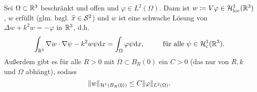 \begin{satz}\label{satz: w ist schwache lösung von helmholtz mit rhs -S}
	Sei \(\Omega\subset\mathbb{R}^3\) beschränkt und offen und \(\varphi\in L^2(\Omega)\). Dann ist \(w\coloneqq V\varphi\in\mathcal{H}_{\mathrm{loc}}^1(\mathbb{R}^3)\), \(w\) erfüllt \SABdp (glm. bzgl. \(\widehat{x}\in\mathcal{S}^2\)) und \(w\) ist eine schwache Lösung von \(\Delta w+k^2w=-\varphi\) in \(\mathbb{R}^3\), d.h.
	\begin{equation}
		\label{w ist schwache lösung 1}
		\int_{\mathbb{R}^3}\nabla w\cdot\nabla\psi-k^2w\psi\mathrm{d}x=\int_\Omega\varphi\psi\mathrm{d}x,\;\qquad\text{ für alle }\psi\in\mathcal{H}_{\mathrm{c}}^1(\mathbb{R}^3).
	\end{equation}
	Außerdem gibt es für alle \(R>0\) mit \(\overline{\Omega}\subset B_R(0)\) ein \(C>0\) (das nur von \(R,k\) und \(\Omega\) abhängt), sodass
	\begin{equation}
		\label{w ist schwache lösung 2}
		\|w\|_{\mathcal{H}^1(B_R(0))}\leq C\|\varphi\|_{L^2(\Omega)}.
	\end{equation}
\end{satz}
